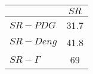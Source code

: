 \begin{tabular}{l|c}
\toprule
{} &  $SR$ \\
\midrule
\textbf{$SR-PDG$   } &  31.7 \\
\textbf{$SR-Deng$  } &  41.8 \\
\textbf{$SR-\Gamma$} &    69 \\
\bottomrule
\end{tabular}
